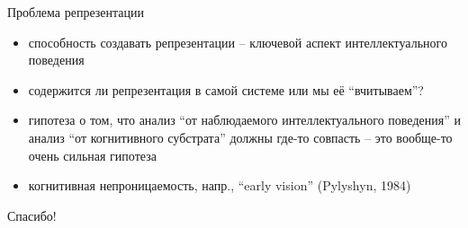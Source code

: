 \documentclass{beamer}
\begin{document}
\begin{frame}{Проблема репрезентации}
\begin{itemize}
	\item способность создавать репрезентации -- ключевой аспект интеллектуального поведения
	\medskip
	\item содержится ли репрезентация в самой системе или мы её ``вчитываем''?
	\medskip
	\item гипотеза о том, что анализ ``от наблюдаемого интеллектуального поведения'' и анализ ``от когнитивного субстрата'' должны где-то совпасть -- это вообще-то очень сильная гипотеза
	\medskip
	\item когнитивная непроницаемость, напр., ``early vision'' (Pylyshyn, 1984)
\end{itemize}
\end{frame}


\begin{frame}{}
    \thispagestyle{empty}
    \begin{center}
        {\large Спасибо!}
    \end{center}
\end{frame}
\end{document}
